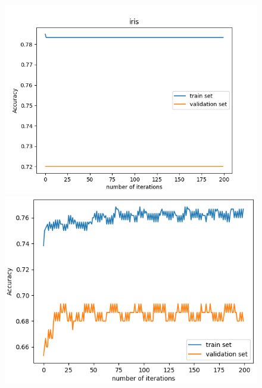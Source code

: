 \documentclass[11pt]{scrartcl}
\begin{document}
\begin{figure}[H]
	\centering
	\begin{minipage}{0.8\linewidth}
		\begin{minipage}[b]{0.48\linewidth}
		  \centering
		  \includegraphics[width= \linewidth]{fig/iris-lr0001.png}
		\end{minipage}
		\hfill
		\begin{minipage}[b]{0.48\linewidth}
		  \centering			
		  \includegraphics[width= \linewidth]{fig/iris-lr-001.png}
		\end{minipage}
		\begin{minipage}[b]{0.48\linewidth}
			\centering

\end{minipage}
\end{minipage}
\end{figure}
\end{document}
